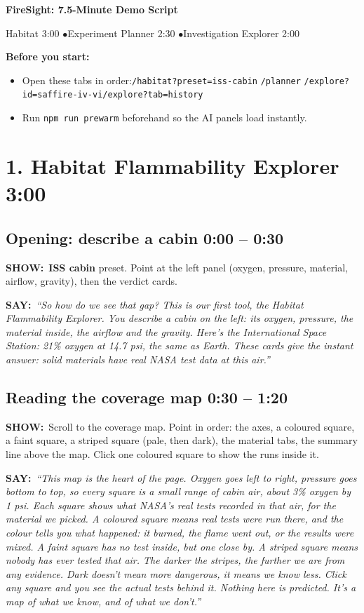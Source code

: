 \documentclass[11pt,a4paper]{article}
\newcommand{\showit}[1]{\par\textbf{\color{showc}SHOW:}\ #1\par}
\newcommand{\sayit}[1]{\par\textbf{\color{sayc}SAY:}\ \textit{``#1''}\par\medskip}
\newcommand{\step}[2]{\subsection{#1 \hfill\normalsize\color{muted}#2}}
\begin{document}
{\centering
{\LARGE\bfseries\color{accent} FireSight: 7.5-Minute Demo Script\par}
\smallskip
{\color{muted} Habitat 3:00 \quad$\bullet$\quad Experiment Planner 2:30 \quad$\bullet$\quad Investigation Explorer 2:00\par}
}
\medskip

\textbf{Before you start:}
\begin{itemize}
  \item Open these tabs in order:\newline \texttt{/habitat?preset=iss-cabin} \quad \texttt{/planner} \quad \texttt{/explore?id=saffire-iv-vi}\newline \texttt{/explore?tab=history}
  \item Run \texttt{npm run prewarm} beforehand so the AI panels load instantly.
\end{itemize}

\section{1. Habitat Flammability Explorer \hfill \normalsize 3:00}

\step{Opening: describe a cabin}{0:00 -- 0:30}
\showit{\textbf{ISS cabin} preset. Point at the left panel (oxygen, pressure, material, airflow, gravity), then the verdict cards.}
\sayit{So how do we see that gap? This is our first tool, the Habitat Flammability Explorer. You describe a cabin on the left: its oxygen, pressure, the material inside, the airflow and the gravity. Here's the International Space Station: 21\% oxygen at 14.7 psi, the same as Earth. These cards give the instant answer: solid materials have real NASA test data at this air.}

\step{Reading the coverage map}{0:30 -- 1:20}
\showit{Scroll to the coverage map. Point in order: the axes, a coloured square, a faint square, a striped square (pale, then dark), the material tabs, the summary line above the map. Click one coloured square to show the runs inside it.}
\sayit{This map is the heart of the page. Oxygen goes left to right, pressure goes bottom to top, so every square is a small range of cabin air, about 3\% oxygen by 1 psi.
Each square shows what NASA's real tests recorded in that air, for the material we picked. A coloured square means real tests were run there, and the colour tells you what happened: it burned, the flame went out, or the results were mixed. A faint square has no test inside, but one close by. A striped square means nobody has ever tested that air. The darker the stripes, the further we are from any evidence. Dark doesn't mean more dangerous, it means we know less.
Click any square and you see the actual tests behind it. Nothing here is predicted. It's a map of what we know, and of what we don't.}
\end{document}
